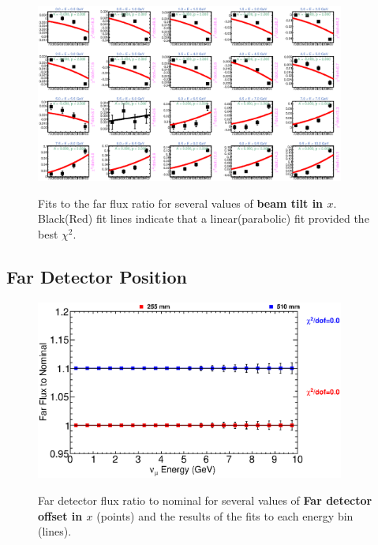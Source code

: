 \begin{figure}[hb]
  \begin{center}
    {\includegraphics[width=4.0in]{figures/Tilt_t_far_fits.eps}}
  \end{center}
\caption{ Fits to the far flux ratio for several values of {\bf beam tilt in $x$}. Black(Red) fit lines indicate that a linear(parabolic) fit provided the best $\chi^2$. }
\end{figure}

\clearpage
\subsection{Far Detector Position}

\begin{figure}[ht]
  \begin{center}
    {\includegraphics[width=4.0in]{figures/LBNENDX_far_summary.eps}}
  \end{center}
\caption{ Far detector flux ratio to nominal for several values of {\bf Far detector offset in $x$} (points) and the results of the fits to each energy bin (lines).}
\end{figure}


